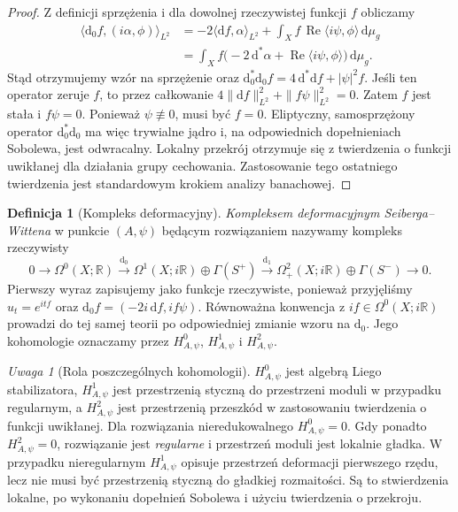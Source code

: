 \documentclass[11pt,a4paper]{report}
\numberwithin{equation}{section}
\theoremstyle{plain}
\theoremstyle{definition}
\newtheorem{definicja}[twierdzenie]{Definicja}
\theoremstyle{remark}
\newtheorem{uwaga}[twierdzenie]{Uwaga}
\begin{document}
\begin{proof}
Z definicji sprzężenia i dla dowolnej rzeczywistej funkcji
$f$ obliczamy
\[
\begin{aligned}
\langle \mathrm d_0f,(i\alpha,\phi)\rangle_{L^2}
&=-2\langle\mathrm df,\alpha\rangle_{L^2}
+\int_X f\,\operatorname{Re}\langle i\psi,\phi\rangle
\,\mathrm d\mu_g\\
&=\int_X f\bigl(-2\,\mathrm d^*\alpha
+\operatorname{Re}\langle i\psi,\phi\rangle\bigr)
\,\mathrm d\mu_g.
\end{aligned}
\]
Stąd otrzymujemy wzór na sprzężenie oraz
$\mathrm d_0^*\mathrm d_0f=4\,\mathrm d^*\mathrm df+|\psi|^2f$.
Jeśli ten operator zeruje $f$, to przez całkowanie
$4\|\mathrm df\|_{L^2}^2+\|f\psi\|_{L^2}^2=0$.
Zatem $f$ jest stała i $f\psi=0$. Ponieważ
$\psi\not\equiv0$, musi być $f=0$.
Eliptyczny, samosprzężony operator $\mathrm d_0^*\mathrm d_0$
ma więc trywialne jądro i, na odpowiednich dopełnieniach
Sobolewa, jest odwracalny. Lokalny przekrój otrzymuje się
z twierdzenia o funkcji uwikłanej dla działania grupy
cechowania. Zastosowanie tego ostatniego twierdzenia
jest standardowym krokiem analizy banachowej.
\end{proof}

\begin{definicja}[Kompleks deformacyjny]
\emph{Kompleksem deformacyjnym Seiberga--Wittena} w punkcie
$(A,\psi)$ będącym rozwiązaniem nazywamy kompleks rzeczywisty
\[
0\longrightarrow\Omega^0(X;\mathbb R)
\xrightarrow{\mathrm d_0}\Omega^1(X;i\mathbb R)\oplus\Gamma(S^+)
\xrightarrow{\mathrm d_1}\Omega^2_+(X;i\mathbb R)\oplus\Gamma(S^-)
\longrightarrow0.
\]
Pierwszy wyraz zapisujemy jako funkcje rzeczywiste,
ponieważ przyjęliśmy $u_t=e^{itf}$ oraz
$\mathrm d_0f=(-2i\,\mathrm df,if\psi)$.
Równoważna konwencja z $if\in\Omega^0(X;i\mathbb R)$
prowadzi do tej samej teorii po odpowiedniej zmianie wzoru
na $\mathrm d_0$. Jego kohomologie oznaczamy przez
$H^0_{A,\psi}$, $H^1_{A,\psi}$ i $H^2_{A,\psi}$.
\end{definicja}

\begin{uwaga}[Rola poszczególnych kohomologii]
$H^0_{A,\psi}$ jest algebrą Liego stabilizatora,
$H^1_{A,\psi}$ jest przestrzenią styczną do przestrzeni
moduli w przypadku regularnym, a $H^2_{A,\psi}$ jest
przestrzenią przeszkód w zastosowaniu twierdzenia o funkcji
uwikłanej. Dla rozwiązania nieredukowalnego
$H^0_{A,\psi}=0$. Gdy ponadto $H^2_{A,\psi}=0$, rozwiązanie
jest \emph{regularne} i przestrzeń moduli jest lokalnie gładka.
W przypadku nieregularnym $H^1_{A,\psi}$ opisuje
przestrzeń deformacji pierwszego rzędu, lecz nie musi być
przestrzenią styczną do gładkiej rozmaitości.
Są to stwierdzenia lokalne, po wykonaniu dopełnień Sobolewa
i użyciu twierdzenia o przekroju.
\end{uwaga}
\end{document}
